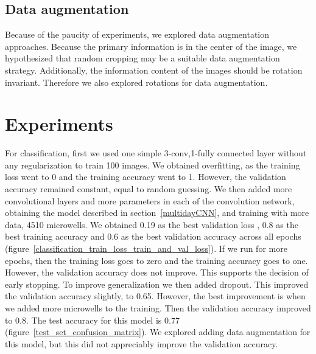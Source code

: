\documentclass[10pt,twocolumn,letterpaper]{article}
\begin{document}
\subsection{Data augmentation}

Because of the paucity of experiments, we explored data augmentation approaches.  Because the primary information is in the center of the image, we hypothesized that random cropping may be a suitable data augmentation strategy.  Additionally, the information content of the images should be rotation invariant.   Therefore we also explored rotations for data augmentation.



 \section{Experiments}
 
For classification, first we used one simple 3-conv,1-fully connected layer without any regularization to train 100 images.  We obtained overfitting, as the training loss went to 0 and the training accuracy  went to 1. However, the validation accuracy remained constant, equal to random guessing.  We then added more convolutional layers and more parameters in each of the convolution network, obtaining the model described in section~\ref{multidayCNN},  and training with more data, 4510 microwells.  We obtained 0.19 as the best validation loss , 0.8 as the best training accuracy and 0.6 as the best validation accuracy across all epochs (figure~\ref{classification_train_loss_train_and_val_loss}).  If we run for more epochs, then the training loss goes to zero and the training accuracy goes to one.  However, the validation accuracy does not improve.  This supports the decision of early stopping.  To improve generalization we then added dropout.  This improved the validation accuracy slightly, to 0.65.
However, the best improvement is when we added more microwells to the training.  Then the validation accuracy improved to 0.8.  The test accuracy for this model is 0.77 (figure~\ref{test_set_confusion_matrix}).
We explored adding data augmentation for this model, but this did not appreciably improve the validation accuracy.
  
\end{document}
